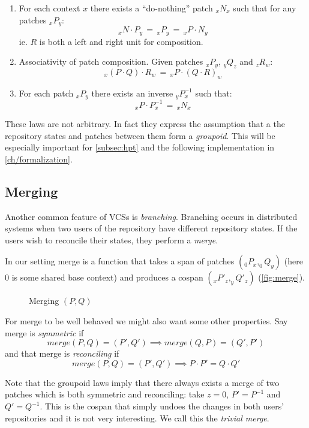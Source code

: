 \begin{enumerate}
\item For each context $x$ there exists a ``do-nothing'' patch $_xN_x$ such that
  for any patches $_xP_y$:
  \[_xN \cdot P_y \,=\, _xP_y \, =\, _xP \cdot N_y\]
  ie. $R$ is both a left and right unit for composition.
\item Associativity of patch composition. Given patches $_xP_y$, $_yQ_z$ and
  $_zR_w$:
  \[_x(P \cdot Q) \cdot R_w \, = \, _xP \cdot (Q \cdot R)_w\]
\item For each patch $_xP_y$ there exists an inverse $_yP^{-1}_x$ such that:
  \[_xP \cdot P^{-1}_x \,=\, _xN_x\]
\end{enumerate}

These laws are not arbitrary. In fact they express the assumption that a the
repository states and patches between them form a \emph{groupoid}. This will be
especially important for \autoref{subsec:hpt} and the following implementation
in \autoref{ch/formalization}.

\subsection{Merging}

Another common feature of VCSs is \emph{branching}. Branching occurs in
distributed systems when two users of the repository have different repository
states. If the users wish to reconcile their states, they perform a
\emph{merge}.

In our setting merge is a function that takes a span of patches $(_0P_x,
_0Q_y)$ (here $0$ is some shared base context) and produces a cospan $(_xP'_z ,
_yQ'_z)$ (\autoref{fig:merge}). 

\begin{figure}
\begin{centering}
\caption{Merging $(P,Q)$}
\label{fig:merge}
\end{centering}
\end{figure}

For merge to be well behaved we might also want some other properties. Say merge
is \emph{symmetric} if \[merge(P,Q) = (P', Q') \implies merge(Q, P) = (Q', P')\]
and that merge is \emph{reconciling} if \[merge(P,Q) = (P',Q') \implies P \cdot
P' = Q \cdot Q'\]

Note that the groupoid laws imply that there always exists a merge of two
patches which is both symmetric and reconciling: take $z = 0$, $P' = P^{-1}$ and
$Q' = Q^{-1}$. This is the cospan that simply undoes the changes in both users' repositories and it
is not very interesting. We call this the \emph{trivial merge}.